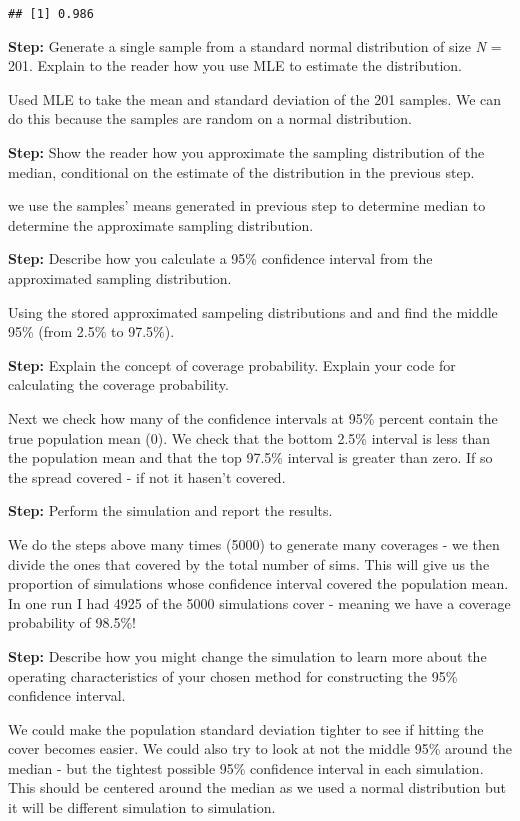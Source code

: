 \documentclass[]{article}
\begin{document}
\begin{verbatim}
## [1] 0.986
\end{verbatim}

\textbf{Step:} Generate a single sample from a standard normal
distribution of size \emph{N} = 201. Explain to the reader how you use
MLE to estimate the distribution.

Used MLE to take the mean and standard deviation of the 201 samples. We
can do this because the samples are random on a normal distribution.

\textbf{Step:} Show the reader how you approximate the sampling
distribution of the median, conditional on the estimate of the
distribution in the previous step.

we use the samples' means generated in previous step to determine median
to determine the approximate sampling distribution.

\textbf{Step:} Describe how you calculate a 95\% confidence interval
from the approximated sampling distribution.

Using the stored approximated sampeling distributions and and find the
middle 95\% (from 2.5\% to 97.5\%).

\textbf{Step:} Explain the concept of coverage probability. Explain your
code for calculating the coverage probability.

Next we check how many of the confidence intervals at 95\% percent
contain the true population mean (0). We check that the bottom 2.5\%
interval is less than the population mean and that the top 97.5\%
interval is greater than zero. If so the spread covered - if not it
hasen't covered.

\textbf{Step:} Perform the simulation and report the results.

We do the steps above many times (5000) to generate many coverages - we
then divide the ones that covered by the total number of sims. This will
give us the proportion of simulations whose confidence interval covered
the population mean. In one run I had 4925 of the 5000 simulations cover
- meaning we have a coverage probability of 98.5\%!

\textbf{Step:} Describe how you might change the simulation to learn
more about the operating characteristics of your chosen method for
constructing the 95\% confidence interval.

We could make the population standard deviation tighter to see if
hitting the cover becomes easier. We could also try to look at not the
middle 95\% around the median - but the tightest possible 95\%
confidence interval in each simulation. This should be centered around
the median as we used a normal distribution but it will be different
simulation to simulation.
\end{document}
